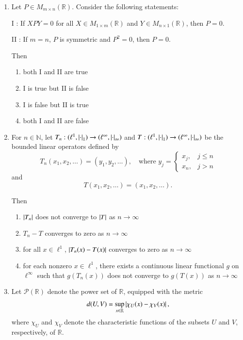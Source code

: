 \documentclass[journal,12pt,onecolumn]{IEEEtran}
\theoremstyle{remark}
\begin{document}
\begin{enumerate}[start=1, label=Q.\arabic*]
\hfill{}
\item Let $P \in M_{m\times n}(\mathbb{R})$. Consider the following statements:

I : If $XPY=0$ for all $X \in M_{1\times m}(\mathbb{R})$ and $Y \in M_{n\times 1}(\mathbb{R})$, then $P=0$.  

II : If $m=n$, $P$ is symmetric and $P^2=0$, then $P=0$.  

Then
\begin{enumerate}
\item both I and II are true
\item I is true but II is false
\item I is false but II is true
\item both I and II are false
\end{enumerate}

\hfill{}


\item For $n \in \mathbb{N}$, let $T_n : (\ell^1,\left\vert\cdot\right\vert_1) \to (\ell^{\infty},\left\vert\cdot\right\vert_{\infty})$ and $T : (\ell^1,\left\vert\cdot\right\vert_1) \to (\ell^{\infty},\left\vert\cdot\right\vert_{\infty})$ be the bounded linear operators defined by
\[
T_n(x_1,x_2,\ldots) = (y_1,y_2,\ldots), \quad \text{where } y_j = \begin{cases} 
x_j, & j \leq n \\ 
x_n, & j>n 
\end{cases}
\]
and
\[
T(x_1,x_2,\ldots) = (x_1,x_2,\ldots).
\]

Then
\begin{enumerate}
\item $\left\vert T_n\right\vert$ does not converge to $\left\vert T\right\vert$ as $n\to \infty$
\item $T_n - T$ converges to zero as $n\to \infty$
\item for all $x \in \ell^1$, $\left\vert T_n(x)-T(x)\right\vert$ converges to zero as $n\to \infty$
\item for each nonzero $x \in \ell^1$, there exists a continuous linear functional $g$ on $\ell^{\infty}$ such that $g(T_n(x))$ does not converge to $g(T(x))$ as $n\to \infty$
\end{enumerate}

\hfill{}


\item Let $\mathcal{P}(\mathbb{R})$ denote the power set of $\mathbb{R}$, equipped with the metric
\[
d(U,V) = \sup_{x\in \mathbb{R}} \left\vert\chi_U(x)-\chi_V(x)\right\vert,
\]
where $\chi_U$ and $\chi_V$ denote the characteristic functions of the subsets $U$ and $V$, respectively, of $\mathbb{R}$.  


\end{enumerate}
\end{document}
